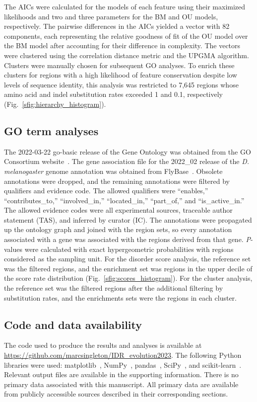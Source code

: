 The AICs were calculated for the models of each feature using their maximized likelihoods and two and three parameters for the BM and OU models, respectively. The pairwise differences in the AICs yielded a vector with 82 components, each representing the relative goodness of fit of the OU model over the BM model after accounting for their difference in complexity. The vectors were clustered using the correlation distance metric and the UPGMA algorithm. Clusters were manually chosen for subsequent GO analyses. To enrich these clusters for regions with a high likelihood of feature conservation despite low levels of sequence identity, this analysis was restricted to 7,645 regions whose amino acid and indel substitution rates exceeded 1 and 0.1, respectively (Fig.~\ref{sfig:hierarchy_histogram}).

\subsection{GO term analyses}
The 2022-03-22 go-basic release of the Gene Ontology was obtained from the GO Consortium website~\cite{Ashburner2000, 2020GOConsortium}. The gene association file for the 2022\_02 release of the \textit{D. melanogaster} genome annotation was obtained from FlyBase~\cite{Gramates2022}. Obsolete annotations were dropped, and the remaining annotations were filtered by qualifiers and evidence code. The allowed qualifiers were ``enables,'' ``contributes\_to,'' ``involved\_in,'' ``located\_in,'' ``part\_of,'' and ``is\_active\_in.'' The allowed evidence codes were all experimental sources, traceable author statement (TAS), and inferred by curator (IC). The annotations were propagated up the ontology graph and joined with the region sets, so every annotation associated with a gene was associated with the regions derived from that gene. \textit{P}-values were calculated with exact hypergeometric probabilities with regions considered as the sampling unit. For the disorder score analysis, the reference set was the filtered regions, and the enrichment set was regions in the upper decile of the score rate distribution (Fig.~\ref{sfig:scores_histogram}). For the cluster analysis, the reference set was the filtered regions after the additional filtering by substitution rates, and the enrichments sets were the regions in each cluster.

\subsection{Code and data availability}
\begin{sloppypar}
The code used to produce the results and analyses is available at \url{https://github.com/marcsingleton/IDR_evolution2023}. The following Python libraries were used: matplotlib~\cite{Hunter2007}, NumPy~\cite{Harris2020}, pandas~\cite{McKinney2010}, SciPy~\cite{Virtanen2020}, and scikit-learn~\cite{Pedregosa2011}. Relevant output files are available in the supporting information. There is no primary data associated with this manuscript. All primary data are available from publicly accessible sources described in their corresponding sections.
\end{sloppypar}
